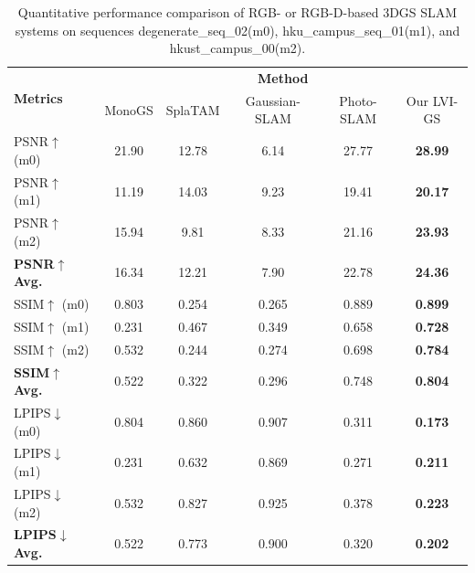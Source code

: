 \documentclass[lettersize,journal]{IEEEtran}
\begin{document}
\begin{table}[htbp]
    \centering
    \renewcommand{\arraystretch}{1.0} %
    \setlength{\tabcolsep}{10pt} %
    \caption{Quantitative performance comparison of RGB- or RGB-D-based 3DGS SLAM systems on sequences degenerate_seq_02(m0), hku_campus_seq_01(m1), and hkust_campus_00(m2).}
    \label{tab:quantitativecomparison2}
    \begin{tabular}{@{}lccccc@{}}
        \toprule
        \multirow{2}{*}{\textbf{Metrics}} & \multicolumn{5}{c}{\textbf{Method}} \\
        \cmidrule(lr){2-6}
        & MonoGS\cite{monogs} & SplaTAM\cite{splatam} & Gaussian-SLAM\cite{gaussianslam} & Photo-SLAM\cite{photoslam} & Our LVI-GS \\
        \midrule
        PSNR$\uparrow$ (m0) & 21.90 & 12.78 & 6.14 & 27.77 & \textbf{28.99} \\
        PSNR$\uparrow$ (m1) & 11.19 & 14.03 & 9.23 & 19.41 & \textbf{20.17} \\
        PSNR$\uparrow$ (m2) & 15.94 & 9.81 & 8.33 & 21.16 & \textbf{23.93} \\
        \midrule
        \textbf{PSNR$\uparrow$ Avg.} & 16.34 & 12.21 & 7.90 & 22.78 & \textbf{24.36} \\
        \midrule
        SSIM$\uparrow$ (m0) & 0.803 & 0.254 & 0.265 & 0.889 & \textbf{0.899} \\
        SSIM$\uparrow$ (m1) & 0.231 & 0.467 & 0.349 & 0.658 & \textbf{0.728} \\
        SSIM$\uparrow$ (m2) & 0.532 & 0.244 & 0.274 & 0.698 & \textbf{0.784} \\
        \midrule
        \textbf{SSIM$\uparrow$ Avg.} & 0.522 & 0.322 & 0.296 & 0.748 & \textbf{0.804} \\
        \midrule
        LPIPS$\downarrow$ (m0) & 0.804 & 0.860 & 0.907 & 0.311 & \textbf{0.173} \\
        LPIPS$\downarrow$ (m1) & 0.231 & 0.632 & 0.869 & 0.271 & \textbf{0.211} \\
        LPIPS$\downarrow$ (m2) & 0.532 & 0.827 & 0.925 & 0.378 & \textbf{0.223} \\
        \midrule
        \textbf{LPIPS$\downarrow$ Avg.} & 0.522 & 0.773 & 0.900 & 0.320 & \textbf{0.202} \\
        \bottomrule
    \end{tabular}
    \captionsetup{justification=centering, labelsep=colon} %
\end{table}
\end{document}
